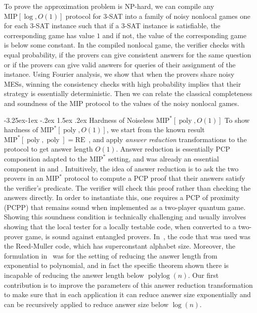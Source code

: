 \documentclass[11pt]{article}
\makeatletter
\renewcommand{\subsubsection}{\@startsection{subsubsection}{2}{\z@}%
             {-3.25ex\@plus -1ex \@minus -.2ex}%
             {1.5ex \@plus .2ex}%
             {\normalfont\normalsize\scshape\bfseries}}
\theoremstyle{plain}
\theoremstyle{definition}
\newcommand{\poly} {\ensuremath{\operatorname{poly}}}
\newcommand{\polylog} {\ensuremath{\operatorname{polylog}}}
\newcommand{\1}{\mathbb{1}} %
\newcommand{\MIP}{\mathrm{MIP}}
\newcommand{\RE}{\mathrm{RE}}
\newcommand{\NP}{\mathrm{NP}}
\makeatother
\begin{document}
To prove the approximation problem is $\NP$-hard, we can compile any $\MIP[\log, O(1)]$ protocol for $3$-SAT into a family of noisy nonlocal games one for each $3$-SAT instance such that if a $3$-SAT instance is satisfiable, the corresponding game has value $1$ and if not, the value of the corresponding game is below some constant. 
In the compiled nonlocal game, the verifier checks with equal probability, if the provers can give consistent answers for the same question or if the provers can give valid answers for queries of their assignment of the instance.
Using Fourier analysis, we show that when the provers share noisy MESs, winning the consistency checks with high probability implies that their strategy is essentially deterministic. Then we can relate the classical completeness and soundness 
of the $\MIP$ protocol to the values of the noisy nonlocal games.

\subsubsection{Hardness of Noiseless \texorpdfstring{$\MIP^*[\poly, O(1)]$}{MIP*[poly, O(1)]}}
To show hardness of $\MIP^*[\poly, O(1)]$, we start from the known result $\MIP^*[\poly, \poly] = \RE$~\cite{JNVWY'20}, and apply \emph{answer reduction} transformations to the protocol to get answer length $O(1)$. Answer reduction is essentially PCP composition adapted to the $\MIP^*$ setting, and was already an essential component in \cite{neexp} and \cite{JNVWY'20}. Intuitively, the idea of answer reduction is to ask the two provers in an $\MIP^*$ protocol to compute a PCP proof that their answers satisfy the verifier's predicate. The verifier will check this proof rather than checking the answers directly. In order to instantiate this, one requires a PCP of proximity (PCPP) that remains sound when implemented as a two-player quantum game. Showing this soundness condition is technically challenging and usually involves showing that the local tester for a locally testable code, when converted to a two-prover game, is sound against entangled provers. In~\cite{JNVWY'20}, the code that was used was the Reed-Muller code, which has superconstant alphabet size.
Moreover, the formulation in~\cite{JNVWY'20} was for the setting of reducing the answer length from exponential to polynomial, and in fact the specific theorem shown there is incapable of reducing the answer length below $\polylog(n)$. Our first contribution is to improve the parameters of this answer reduction transformation to make sure that in each application it can reduce answer size exponentially and can be recursively applied to reduce answer size below $\log(n)$.
\end{document}
